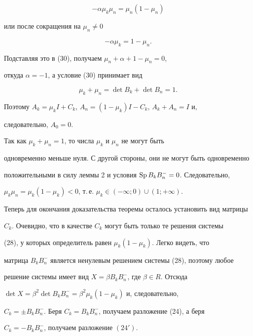 \begin{pf}
$$ 


-\alpha\mu_k\mu_n=\mu_n(1-\mu_n) 


$$ 


или после сокращения на $\mu_n\ne0$ 


$$ 


-\alpha\mu_k=1-\mu_n.


$$ 


Подставляя это в (30), получаем $\mu_n+\alpha+1-\mu_n=0$, 


откуда $\alpha=-1$, а условие (30) принимает вид 


$$ 


\mu_k+\mu_n=\det B_k+\det B_n=1. 


$$ 


Поэтому $A_k=\mu_k I+C_k$, $A_n=(1-\mu_k)I-C_k$, $A_k+A_n=I$ и, 


следовательно, $A_0=0$. 


 


Так как $\mu_k+\mu_n=1$, то числа $\mu_k$ и $\mu_n$ не могут быть 


одновременно меньше нуля. С другой стороны, они не могут быть одновременно 


положительными в силу леммы 2 и условия $\operatorname{Sp} B_k B^-_n=0$. Следовательно, 


$\mu_k\mu_n=\mu_k(1-\mu_k)<0$, т.\,е. $\mu_k\in(-\infty;0)\cup(1;+\infty)$. 


 


Теперь для окончания доказательства теоремы осталось установить вид матрицы 


$C_k$. Очевидно, что в качестве $C_k$ могут быть только те решения системы 


(28), у которых определитель равен $\mu_k(1-\mu_k)$. Легко видеть, что 


матрица $B_k B^-_n$ является ненулевым решением системы (28), поэтому любое 


решение системы имеет вид $X=\beta B_k B^-_n$, где $\beta\in R$. Отсюда 


$\det X=\beta^2\det B_k B^-_n=\beta^2\mu_k(1-\mu_k)$ и, следовательно, 


$C_k=\pm B_k B^-_n$. Беря $C_k=B_k B^-_n$, получаем разложение (24), а беря 


$C_k=-B_k B^-_n$, получаем разложение $(24')$. 


\end{pf}


